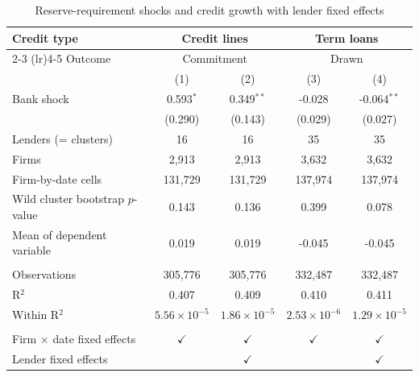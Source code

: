 
\begin{table}[!h]
   \centering
   \small
   \begin{threeparttable}[b]
      \caption{\label{tab:encaje_loan_growth_lender_fe} Reserve-requirement shocks and credit growth with lender fixed effects}
      \bigskip
      \begin{tabular}{lcccc}
         \toprule
         Credit type & \multicolumn{2}{c}{Credit lines} & \multicolumn{2}{c}{Term loans} \\ 
         \cmidrule(lr){2-3} \cmidrule(lr){4-5}
         Outcome & \multicolumn{2}{c}{Commitment} & \multicolumn{2}{c}{Drawn} \\ 
                                           & (1)                   & (2)                   & (3)                   & (4)\\  
         \midrule 
         Bank shock                        & 0.593$^{*}$           & 0.349$^{**}$          & -0.028                & -0.064$^{**}$\\   
                                           & (0.290)               & (0.143)               & (0.029)               & (0.027)\\   
         Lenders (= clusters)              & 16                    & 16                    & 35                    & 35\\  
         Firms                             & 2,913                 & 2,913                 & 3,632                 & 3,632\\  
         Firm-by-date cells                & 131,729               & 131,729               & 137,974               & 137,974\\  
         Wild cluster bootstrap $p$-value  & 0.143                 & 0.136                 & 0.399                 & 0.078\\  
         Mean of dependent variable        & 0.019                 & 0.019                 & -0.045                & -0.045\\  
          \\
         Observations                      & 305,776               & 305,776               & 332,487               & 332,487\\  
         R$^2$                             & 0.407                 & 0.409                 & 0.410                 & 0.411\\  
         Within R$^2$                      & $5.56\times 10^{-5}$  & $1.86\times 10^{-5}$  & $2.53\times 10^{-6}$  & $1.29\times 10^{-5}$\\   
          \\
         Firm $\times$ date fixed effects  & $\checkmark$          & $\checkmark$          & $\checkmark$          & $\checkmark$\\   
         Lender fixed effects              &                       & $\checkmark$          &                       & $\checkmark$\\   
         \bottomrule
      \end{tabular}
      

\end{threeparttable}
\end{table}
